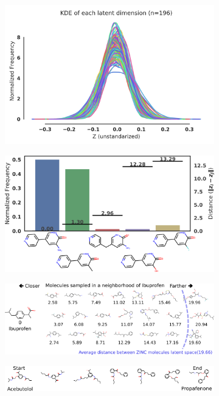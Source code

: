 \begin{figure}
    \centering
	\begin{subfigure}{0.48\textwidth}
       \caption{}
       \includegraphics[width=\textwidth]{fig2a_dims_unstandard_Z.png}
    \end{subfigure}
    \vspace{1em}
	\begin{subfigure}{0.48\textwidth}
       \caption{}
       \includegraphics[width=\textwidth]{fig2b_Ibandronate_hist_BIG.png}
    \end{subfigure}
	\begin{subfigure}{\textwidth}
       \caption{}
	    \includegraphics[width=\textwidth]{fig2c_Ibuprofen_local.png}
    \end{subfigure}
	\begin{subfigure}{\textwidth}
       \caption{}
	    \includegraphics[width=\textwidth]{fig2d_interp_nice.png}
    \end{subfigure}


\end{figure}
